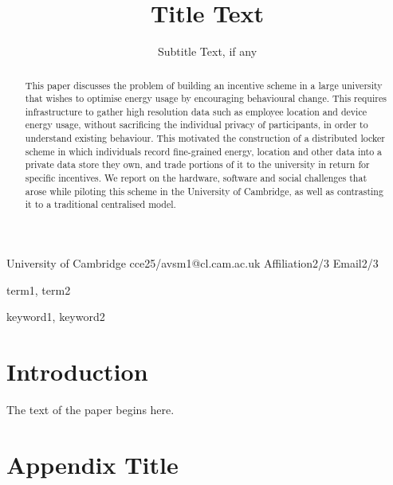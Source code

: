 \documentclass[10pt,twocolumn]{sigplanconf}
\begin{document}
\copyrightdata{[to be supplied]} 


\title{Title Text}
\subtitle{Subtitle Text, if any}

           {University of Cambridge}
           {cce25/avsm1@cl.cam.ac.uk}
           {Affiliation2/3}
           {Email2/3}

\maketitle

\begin{abstract}

This paper discusses the problem of building an incentive scheme in a large university that wishes to optimise energy usage by encouraging behavioural change. This requires infrastructure to gather high resolution data such as employee location and device energy usage, without sacrificing the individual privacy of participants, in order to understand existing behaviour. This motivated the construction of a distributed locker scheme in which individuals record fine-grained energy, location and other data into a private data store they own, and trade portions of it to the university in return for specific incentives. We report on the hardware, software and social challenges that arose while piloting this scheme in the University of Cambridge, as well as contrasting it to a traditional centralised model.

\end{abstract}


\terms
term1, term2

\keywords
keyword1, keyword2

\section{Introduction}

The text of the paper begins here.

\appendix
\section{Appendix Title}
\end{document}
